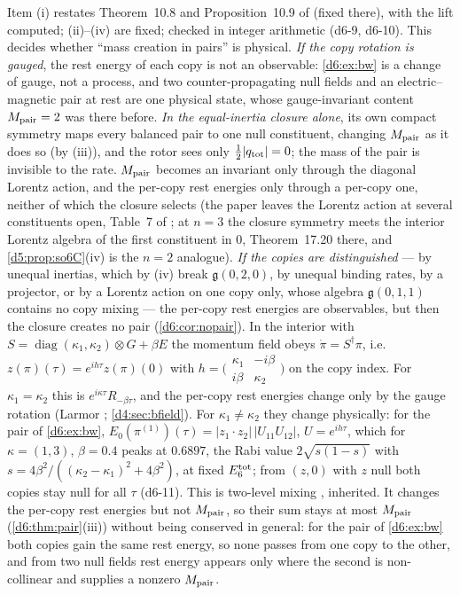 Item (i) restates Theorem~10.8 and Proposition~10.9 of \cite{ES17} (fixed there), with the lift computed; (ii)--(iv) are fixed; checked in integer
arithmetic (d6-9, d6-10). This decides whether ``mass creation in pairs'' is physical. \emph{If the copy rotation is gauged}, the rest energy of
each copy is not an observable: \cref{d6:ex:bw} is a change of gauge, not a process, and two counter-propagating null fields and an
electric--magnetic pair at rest are one physical state, whose gauge-invariant content $M_{\rm pair}=2$ was there before. \emph{In the
equal-inertia closure alone}, its own compact symmetry maps every balanced pair to one null constituent, changing $M_{\rm pair}$ as it does so (by (iii)), and the rotor sees only
$\tfrac12|q_{\rm tot}|=0$; the mass of the pair is invisible to the rate. $M_{\rm pair}$ becomes an invariant only through the diagonal Lorentz action, and the per-copy rest energies only through a per-copy one,
neither of which the closure selects (the paper leaves the Lorentz action at several constituents open, Table~7 of \cite{ES17}; at $n=3$ the closure symmetry meets the interior Lorentz algebra of the first constituent in $0$, Theorem~17.20 there, and \cref{d5:prop:so6C}(iv) is the $n=2$ analogue). \emph{If the copies are
distinguished} --- by unequal inertias, which by (iv) break $\mathfrak g(0,2,0)$, by unequal binding rates, by a projector, or by a Lorentz
action on one copy only, whose algebra $\mathfrak g(0,1,1)$ contains no copy mixing --- the per-copy rest energies are observables, but then the
closure creates no pair (\cref{d6:cor:nopair}). In the interior with $S=\operatorname{diag}(\kappa_1,\kappa_2)\otimes G+\beta E$ the momentum field
obeys $\dot\pi=S^\dagger\pi$, i.e.\ $z(\pi)(\tau)=e^{ih\tau}z(\pi)(0)$ with $h=\bigl(\begin{smallmatrix}\kappa_1&-i\beta\\i\beta&\kappa_2\end{smallmatrix}\bigr)$ on the
copy index. For $\kappa_1=\kappa_2$ this is $e^{i\kappa\tau}R_{-\beta\tau}$, and the per-copy rest energies change only by the gauge rotation
(Larmor \cite{Larmor1897}; \cref{d4:sec:bfield}). For $\kappa_1\neq\kappa_2$ they change physically: for the pair of \cref{d6:ex:bw},
$E_0(\pi^{(1)})(\tau)=|z_1\cdot z_2|\,|U_{11}U_{12}|$, $U=e^{ih\tau}$, which for $\kappa=(1,3)$, $\beta=0.4$ peaks at $0.6897$, the Rabi value
$2\sqrt{s(1-s)}$ with $s=4\beta^2/((\kappa_2-\kappa_1)^2+4\beta^2)$, at fixed $E_6^{\rm tot}$; from $(z,0)$ with $z$ null both copies stay null for all
$\tau$ (d6-11). This is two-level mixing \cite{Rabi37}, inherited. It changes the per-copy rest energies but not $M_{\rm pair}$, so their sum stays at most
$M_{\rm pair}$ (\cref{d6:thm:pair}(iii)) without being conserved in general: for the pair of \cref{d6:ex:bw} both copies gain the same rest
energy, so none passes from one copy to the other, and from two null fields rest energy appears only where the second is non-collinear and
supplies a nonzero $M_{\rm pair}$.


